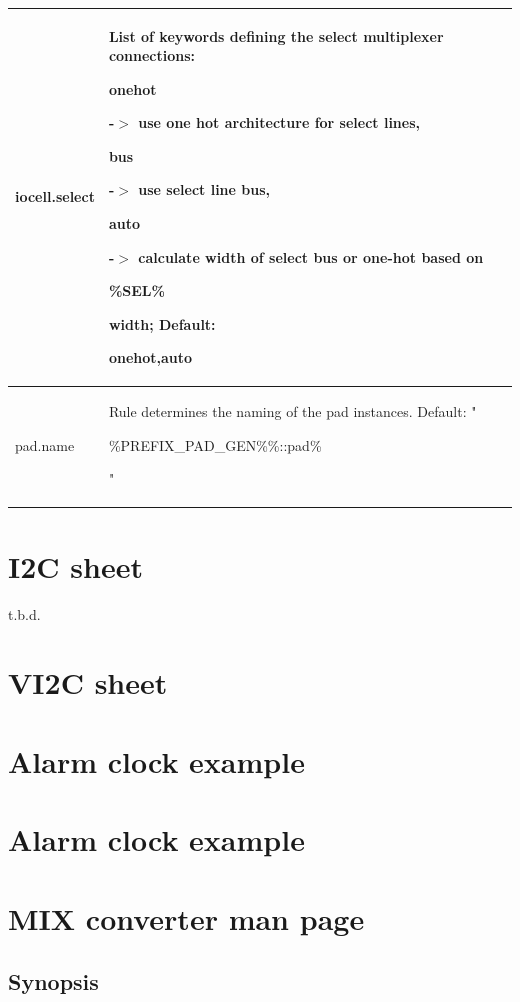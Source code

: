 \documentclass[a4paper,12pt]{article}
\begin{document}
\begin{tabular}{|p{4cm}|p{9cm}|}
\begin{tt}iocell.select\end{tt} & List of keywords defining the select multiplexer connections: \begin{tt}onehot\end{tt} -$>$ use one hot architecture for select lines, \begin{tt}bus\end{tt} -$>$ use select line bus, \begin{tt}auto\end{tt} -$>$ calculate width of select bus or one-hot based on \begin{tt}\%SEL\%\end{tt} width; Default: \begin{tt}onehot,auto\end{tt}\\\hline
\begin{tt}pad.name\end{tt} & Rule determines the naming of the pad instances. Default: "\begin{tt}\%PREFIX\_PAD\_GEN\%\%::pad\%\end{tt}" \\\hline
\end{tabular}

\section{I2C sheet}
t.b.d.\newline
\section{VI2C sheet}
\section{Alarm clock example}
\section{Alarm clock example}
\section{MIX converter man page}
\subsection{Synopsis}
\end{document}
